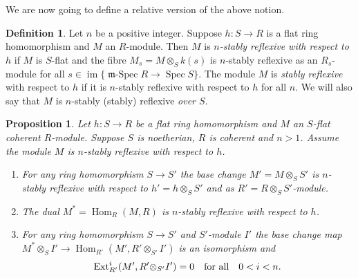 \documentclass[a4paper,10pt]{amsart}
\theoremstyle{plain}
\newtheorem{prop}[xx]{Proposition}%
\theoremstyle{definition}
\newtheorem{defn}[xx]{Definition}%
\theoremstyle{remark}
\numberwithin{equation}{xx}
\DeclareMathOperator{\Ext}{Ext}
\DeclareMathOperator{\Hom}{Hom}
\DeclareMathOperator{\im}{im}
\DeclareMathOperator{\mSpec}{\fr{m}-Spec}
\DeclareMathOperator{\Spec}{Spec}
\newcommand{\co}{\colon}
\newcommand{\ra}{\rightarrow}
\newcommand{\ot}{{\otimes}}
\newcommand{\fr}[1]{\mathfrak{{#1}}}
\newcommand{\hm}[4]{{\Hom}_{#2}^{#1}({#3},{#4})}
\newcommand{\xt}[4]{{\Ext} _{#2}^{#1}({#3},{#4})}
\begin{document}
We are now going to define a relative version of the above notion.
\begin{defn}\label{def.relnstab}
Let \(n\) be a positive integer. Suppose \(h\co S\ra R\) is a flat ring homomorphism and \(M\) an \(R\)-module. Then \(M\) is \emph{\(n\)-stably reflexive with respect to \(h\)} if \(M\) is \(S\)-flat and the fibre \(M_{s}=M\ot_{S}k(s)\) is \(n\)-stably reflexive as an \(R_{s}\)-module for all \(s\in\im\{\mSpec R\ra\Spec S\}\). The module \(M\) is \emph{stably reflexive} with respect to \(h\) if it is \(n\)-stably reflexive with respect to \(h\) for all \(n\). We will also say that \(M\) is \(n\)-stably (stably) reflexive \emph{over \(S\)}.
\end{defn}
\begin{prop}\label{prop.main}
Let \(h\co S\ra R\) be a flat ring homomorphism and \(M\) an \(S\)-flat coherent \(R\)-module\textup{.} Suppose \(S\) is noetherian\textup{,} \(R\) is coherent and \(n>1\)\textup{.} Assume the module \(M\) is \(n\)-stably reflexive with respect to \(h\)\textup{.}
\begin{enumerate}
\item[(i)] For any ring homomorphism \(S\ra S'\) the base change \(M'=M\ot_{S}S'\) is \(n\)-stably reflexive with respect to \(h'=h\ot_{S}S'\) and as \(R'=R\ot_{S}S'\)-module\textup{.}
\item[(ii)] The dual \(M^{*}=\hm{}{R}{M}{R}\) is \(n\)-stably reflexive with respect to \(h\)\textup{.}
\item[(iii)] For any ring homomorphism \(S\ra S'\) and \(S'\)-module \(I'\) the base change map \(M^{*}\ot_{S}I'\ra\hm{}{R'}{M'}{R'\ot_{S'}I'}\) is an isomorphism and 
\begin{equation*}
\xt{i}{R'}{M'}{R'\ot_{S'}I'}=0\quad \text{for all}\quad 0<i<n\textup{.}
\end{equation*}
\end{enumerate}
\end{prop}
\end{document}
